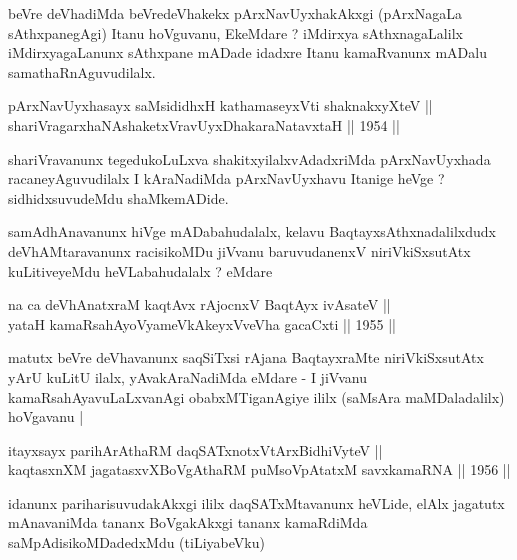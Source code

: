 \begin{artha}
beVre deVhadiMda beVredeVhakekx pArxNavUyxhakAkxgi
(pArxNagaLa sAthxpanegAgi) Itanu hoVguvanu, EkeMdare ? iMdirxya
sAthxnagaLalilx iMdirxyagaLanunx sAthxpane mADade idadxre Itanu
kamaRvanunx mADalu samathaRnAguvudilalx.
\end{artha}


\begin{shl}
pArxNavUyxhasayx saMsididhxH kathamaseyxVti shaknakxyXteV || \\
shariVragarxhaNAshaketxVravUyxDhakaraNatavxtaH ||  1954 ||  
\end{shl}

\begin{artha}
shariVravanunx tegedukoLuLxva shakitxyilalxvAdadxriMda
pArxNavUyxhada racaneyAguvudilalx I kAraNadiMda
pArxNavUyxhavu Itanige heVge ? sidhidxsuvudeMdu shaMkemADide.
\end{artha}

\begin{artha}
samAdhAnavanunx hiVge mADabahudalalx, kelavu BaqtayxsAthxnadalilxdudx
deVhAMtaravanunx racisikoMDu jiVvanu baruvudanenxV niriVkiSxsutAtx
kuLitiveyeMdu heVLabahudalalx ? eMdare
\end{artha}


\begin{shl}
na ca deVhAnatxraM kaqtAvx rAjocnxV BaqtAyx ivA\s \s sateV || \\
yataH kamaRsahAyoV\s yameVkAkeyxVveVha gacaCxti ||  1955 ||  
\end{shl}

\begin{artha}
matutx beVre deVhavanunx saqSiTxsi rAjana BaqtayxraMte niriVkiSxsutAtx
yArU kuLitU ilalx, yAvakAraNadiMda eMdare - I jiVvanu
kamaRsahAyavuLaLxvanAgi obabxMTiganAgiye ililx (saMsAra maMDaladalilx)
hoVgavanu |
\end{artha}


\begin{shl}
itayxsayx parihArAthaRM daqSATxnotxV\s tArxBidhiVyteV ||  \\
kaqtasxnXM jagatasxvXBoVgAthaRM puMsoVpAtatxM savxkamaRNA ||  1956 ||  
\end{shl}

\begin{artha}
idanunx pariharisuvudakAkxgi ililx daqSATxMtavanunx heVLide, elAlx
jagatutx mAnavaniMda tananx BoVgakAkxgi tananx kamaRdiMda
saMpAdisikoMDadedxMdu (tiLiyabeVku)
\end{artha}

